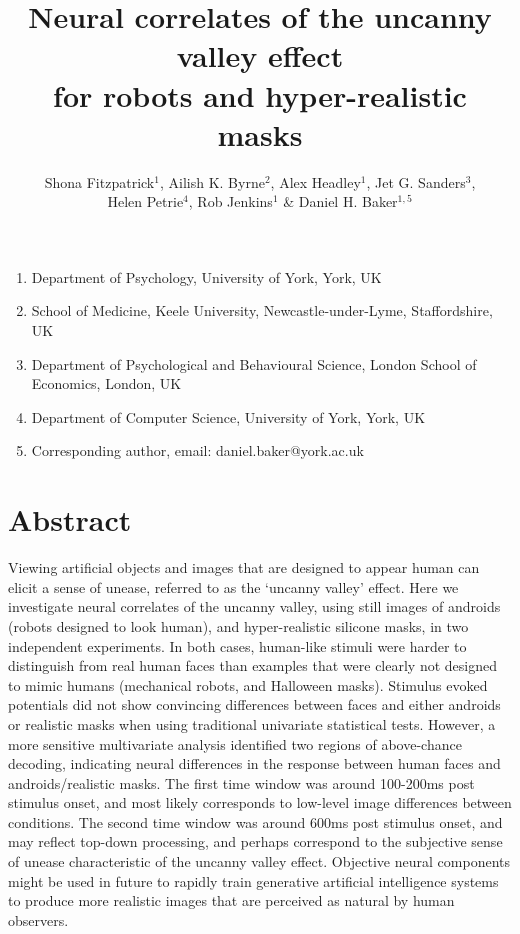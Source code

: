 \documentclass[
]{article}
\title{Neural correlates of the uncanny valley effect\\
for robots and hyper-realistic masks}
\author{Shona Fitzpatrick\(^1\), Ailish K. Byrne\(^2\), Alex Headley\(^1\), Jet G. Sanders\(^3\),\\
Helen Petrie\(^4\), Rob Jenkins\(^1\) \& Daniel H. Baker\(^{1,5}\)}
\date{}
\providecommand{\tightlist}{%
  \setlength{\itemsep}{0pt}\setlength{\parskip}{0pt}}
\begin{document}
\maketitle

\begin{enumerate}
\def\labelenumi{\arabic{enumi}.}
\tightlist
\item
  Department of Psychology, University of York, York, UK
\item
  School of Medicine, Keele University, Newcastle-under-Lyme, Staffordshire, UK
\item
  Department of Psychological and Behavioural Science, London School of Economics, London, UK
\item
  Department of Computer Science, University of York, York, UK
\item
  Corresponding author, email: daniel.baker@york.ac.uk
\end{enumerate}

\hypertarget{abstract}{%
\section{Abstract}\label{abstract}}

Viewing artificial objects and images that are designed to appear human can elicit a sense of unease, referred to as the `uncanny valley' effect. Here we investigate neural correlates of the uncanny valley, using still images of androids (robots designed to look human), and hyper-realistic silicone masks, in two independent experiments. In both cases, human-like stimuli were harder to distinguish from real human faces than examples that were clearly not designed to mimic humans (mechanical robots, and Halloween masks). Stimulus evoked potentials did not show convincing differences between faces and either androids or realistic masks when using traditional univariate statistical tests. However, a more sensitive multivariate analysis identified two regions of above-chance decoding, indicating neural differences in the response between human faces and androids/realistic masks. The first time window was around 100-200ms post stimulus onset, and most likely corresponds to low-level image differences between conditions. The second time window was around 600ms post stimulus onset, and may reflect top-down processing, and perhaps correspond to the subjective sense of unease characteristic of the uncanny valley effect. Objective neural components might be used in future to rapidly train generative artificial intelligence systems to produce more realistic images that are perceived as natural by human observers.
\end{document}
